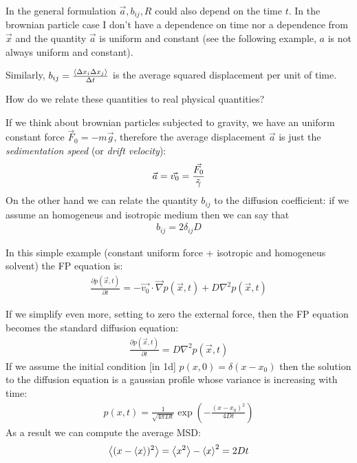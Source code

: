 \documentclass[\main/main.tex]{subfiles}
\begin{document}
In the general formulation $\vec{a}, b_{ij},R$ could also depend on the time $t$. In the brownian particle case I don't have a dependence on time nor a dependence from $\vec{x}$ and the quantity $\vec{a}$ is uniform and constant (see the following example, $a$ is not always uniform and constant).

Similarly, $b_{ij}=\frac{\left\langle \Delta x_i \Delta x_j \right\rangle}{\Delta t}$ is the average squared displacement per
unit of time. 

How do we relate these quantities to real physical quantities?

If we think about brownian particles subjected to gravity, we have an uniform constant force $\vec{F}_0=-m\vec{g}$, therefore the average displacement $\vec{a}$ is just the \textit{sedimentation speed} (or \textit{drift velocity}):
\begin{eqnarray}
\vec{a}= \vec{v_0}=\frac{\vec{F_0}}{\Tilde{\gamma}} 
\end{eqnarray}
On the other hand we can relate the quantity $b_{ij}$ to the diffusion coefficient: if we assume an homogeneus and isotropic medium then we can say that
\begin{eqnarray}
b_{ij}=2 \delta_{ij}D
\end{eqnarray}

In this simple example (constant uniform force + isotropic and homogeneus solvent) the FP equation is:
\begin{eqnarray}
\frac{\partial p (\vec{x},t)}{\partial t}= -\vec{v_0}\cdot\vec{\nabla} p(\vec{x},t)+D\nabla^2 p(\vec{x},t)
\end{eqnarray}

If we simplify even more, setting to zero the external force, then the FP equation becomes the standard diffusion equation:
\begin{eqnarray}
\frac{\partial p (\vec{x},t)}{\partial t}= D \nabla^2 p(\vec{x},t)
\end{eqnarray}
If we assume the initial condition [in 1d] $p(x,0)=\delta(x-x_0)$ then the solution to the diffusion equation is a gaussian profile whose variance is increasing with time:
\begin{eqnarray}
p(x,t)=\frac{1}{\sqrt{4\pi D t}}\exp(-\frac{(x-x_0)^2}{4D t})
\end{eqnarray}
As a result we can compute the average MSD:
\begin{eqnarray}
\left\langle (x-\left\langle x \right\rangle)^2 \right\rangle=\left\langle x^2 \right\rangle-\left\langle x \right\rangle^2=2Dt
\label{eq:MSD}
\end{eqnarray}
\end{document}
